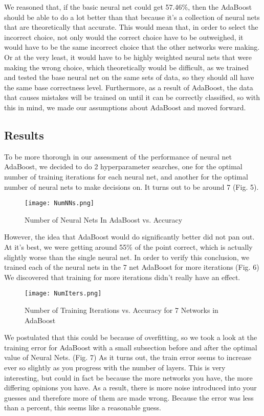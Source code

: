 \documentclass[conference]{IEEEtran}
\begin{document}
We reasoned that, if the basic neural net could get 57.46\%, then the AdaBoost should be able to do a lot better than that because it’s a collection of neural nets that are theoretically that accurate. This would mean that, in order to select the incorrect choice, not only would the correct choice have to be outweighed, it would have to be the same incorrect choice that the other networks were making. Or at the very least, it would have to be highly weighted neural nets that were making the wrong choice, which theoretically would be difficult, as we trained and tested the base neural net on the same sets of data, so they should all have the same base correctness level. Furthermore, as a result of AdaBoost, the data that causes mistakes will be trained on until it can be correctly classified, so with this in mind, we made our assumptions about AdaBoost and moved forward.

\subsection{Results}

To be more thorough in our assessment of the performance of neural net AdaBoost, we decided to do 2 hyperparameter searches, one for the optimal number of training iterations for each neural net, and another for the optimal number of neural nets to make decisions on. It turns out to be around 7 (Fig. 5). 
\begin{figure}[h]
\centerline{\texttt{[image: NumNNs.png]}}
\caption{Number of Neural Nets In AdaBoost vs. Accuracy}
\label{fig}
\end{figure}

However, the idea that AdaBoost would do significantly better did not pan out. At it's best, we were getting around 55\% of the point correct, which is actually slightly worse than the single neural net. In order to verify this conclusion, we trained each of the neural nets in the 7 net AdaBoost for more iterations (Fig. 6) We discovered that training for more iterations didn't really have an effect. \newline
\begin{figure}[h]
\centerline{\texttt{[image: NumIters.png]}}
\caption{Number of Training Iterations vs. Accuracy for 7 Networks in AdaBoost}
\label{fig}
\end{figure}

We postulated that this could be because of overfitting, so we took a look at the training error for AdaBoost with a small subsection before and after the optimal value of Neural Nets. (Fig. 7) As it turns out, the train error seems to increase ever so slightly as you progress with the number of layers. This is very interesting, but could in fact be because the more networks you have, the more differing opinions you have. As a result, there is more noise introduced into your guesses and therefore more of them are made wrong. Because the error was less than a percent, this seems like a reasonable guess.
\end{document}

